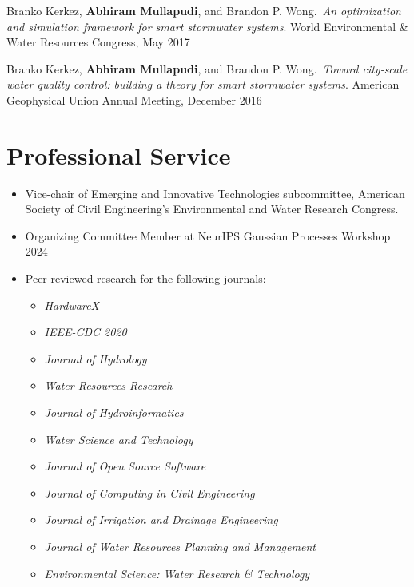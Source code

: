 \documentclass[a4paper,11pt]{article}
\newcommand{\years}[1]{%
  {\reversemarginpar\strut\marginnote{{\small#1}}}%
}
\begin{document}
\years{2017} Branko Kerkez, \textbf{Abhiram Mullapudi}, and Brandon P. Wong.\ \emph{An optimization and simulation framework for smart stormwater systems}. World Environmental \& Water Resources Congress, May 2017\\[.1cm]

\years{2016} Branko Kerkez, \textbf{Abhiram Mullapudi}, and Brandon P. Wong.\ \emph{Toward city-scale water quality control: building a theory for smart stormwater systems}. American Geophysical Union Annual Meeting, December 2016

\section*{Professional Service}

\begin{itemize}
	\item Vice-chair of Emerging and Innovative Technologies subcommittee, American Society of Civil Engineering's Environmental and Water Research Congress.
	\item Organizing Committee Member at NeurIPS Gaussian Processes Workshop 2024
	\item Peer reviewed research for the following journals:
	\begin{itemize}
	\setlength\itemsep{0mm}
		\item \textit{HardwareX}
		\item \textit{IEEE-CDC 2020}
		\item \textit{Journal of Hydrology}
		\item \textit{Water Resources Research}
		\item \textit{Journal of Hydroinformatics}
		\item \textit{Water Science and Technology}
		\item \textit{Journal of Open Source Software}
		\item \textit{Journal of Computing in Civil Engineering}
		\item \textit{Journal of Irrigation and Drainage Engineering}
		\item \textit{Journal of Water Resources Planning and Management}
		\item \textit{Environmental Science: Water Research \& Technology}
	\end{itemize}
\end{itemize}
\end{document}
